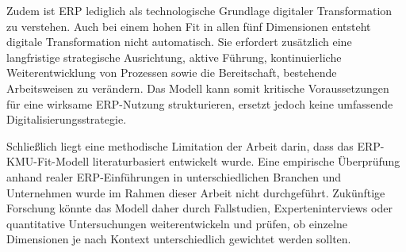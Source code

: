 Zudem ist ERP lediglich als technologische Grundlage digitaler Transformation zu verstehen. Auch bei einem hohen Fit in allen 
fünf Dimensionen entsteht digitale Transformation nicht automatisch. Sie erfordert zusätzlich eine langfristige strategische 
Ausrichtung, aktive Führung, kontinuierliche Weiterentwicklung von Prozessen sowie die Bereitschaft, bestehende Arbeitsweisen 
zu verändern. Das Modell kann somit kritische Voraussetzungen für eine wirksame ERP-Nutzung strukturieren, ersetzt jedoch keine 
umfassende Digitalisierungsstrategie.

Schließlich liegt eine methodische Limitation der Arbeit darin, dass das ERP-KMU-Fit-Modell literaturbasiert entwickelt wurde. 
Eine empirische Überprüfung anhand realer ERP-Einführungen in unterschiedlichen Branchen und Unternehmen wurde im Rahmen dieser 
Arbeit nicht durchgeführt. Zukünftige Forschung könnte das Modell daher durch Fallstudien, Experteninterviews oder quantitative 
Untersuchungen weiterentwickeln und prüfen, ob einzelne Dimensionen je nach Kontext unterschiedlich gewichtet werden sollten.
